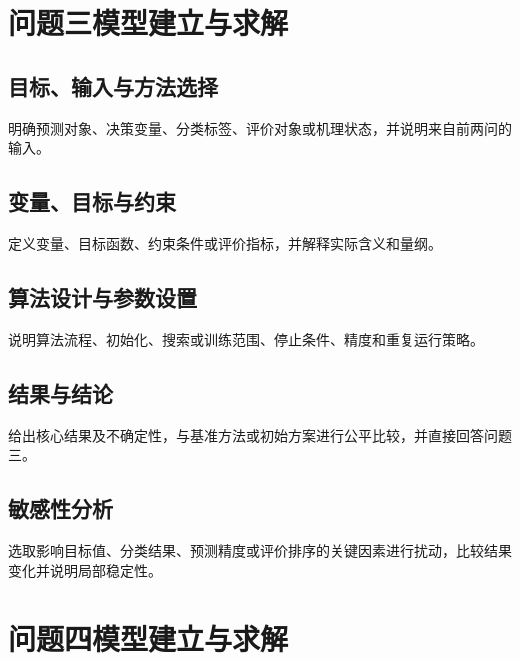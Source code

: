 \documentclass[UTF8,a4paper,12pt]{ctexart}
\newif\ifshowguide
\newcommand{\WriteGuide}[3]{%
  \ifshowguide
  \begin{quote}
    \small
    \textbf{写什么：}#1\par
    \textbf{怎么写：}#2\par
    \textbf{避免：}#3
  \end{quote}
  \fi
}
\begin{document}
\section{问题三模型建立与求解}

\WriteGuide
  {处理问题三的预测、分类、评价、优化或机理任务。}
  {明确预测对象或决策变量；若使用优化，报告可行性；若使用预测或分类，说明训练与验证方式。}
  {把可行解写成全局最优；训练与验证数据混用；多目标权重没有依据。}

\subsection{目标、输入与方法选择}
明确预测对象、决策变量、分类标签、评价对象或机理状态，并说明来自前两问的输入。

\subsection{变量、目标与约束}
定义变量、目标函数、约束条件或评价指标，并解释实际含义和量纲。

\subsection{算法设计与参数设置}
说明算法流程、初始化、搜索或训练范围、停止条件、精度和重复运行策略。

\subsection{结果与结论}
给出核心结果及不确定性，与基准方法或初始方案进行公平比较，并直接回答问题三。

\subsection{敏感性分析}
选取影响目标值、分类结果、预测精度或评价排序的关键因素进行扰动，比较结果变化并说明局部稳定性。

\section{问题四模型建立与求解}

\WriteGuide
  {在前述结果上完成推广、改进、多目标权衡、策略设计或更严格的验证。}
  {先说明继承哪些模型和参数，再定义新增目标或限制，并报告收益、代价和适用范围。}
  {新模型与前文无关；只说进一步优化却没有明确指标；忽略改进代价。}
\end{document}
